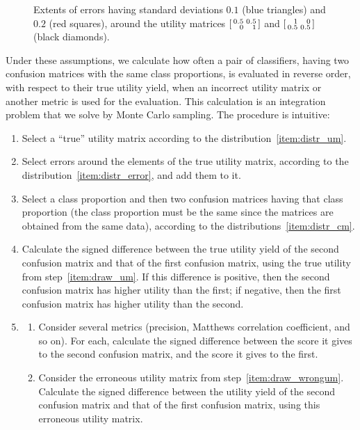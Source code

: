 \documentclass[\ifafour a4paper,12pt,\else a5paper,10pt,\fi%
onecolumn,oneside,article,%
british%
]{memoir}
\theoremstyle{remark}
\theoremstyle{innote}
\renewcommand*{\|}[1][]{\nonscript\:#1\vert\nonscript\:\mathopen{}}
\newcommand*{\sumatrix}[4]{\begin{bsmallmatrix*}[r]#1&#2\\#3&#4\end{bsmallmatrix*}}
\begin{document}
\begin{figure}[t]
{    \caption{Extents of errors having standard deviations $0.1$ ({\color{mypurpleblue}blue triangles}) and $0.2$ ({\color{myred}red squares}), around the utility matrices $\sumatrix{ 0.5}{0.5}{0}{1 }$ and $\sumatrix{ 1}{0}{0.5}{0.5 }$ (black diamonds).}
    \label{fig:error_distr_um}}
\end{figure}

Under these assumptions, we calculate how often a pair of classifiers, having two confusion matrices with the same class proportions, is evaluated in reverse order, with respect to their true utility yield, when an incorrect utility matrix or another metric is used for the evaluation. This calculation is an integration problem that we solve by Monte Carlo sampling. The procedure is intuitive:
\begin{enumerate}[label=\arabic*.,ref=\arabic*]
\item\label{item:draw_um} Select a \enquote{true} utility matrix according to the distribution~\ref{item:distr_um}.
\item\label{item:draw_wrongum} Select errors around the elements of the true utility matrix, according to the distribution~\ref{item:distr_error}, and add them to it.
\item\label{item:draw_cm} Select a class proportion and then two confusion matrices having that class proportion (the class proportion must be the same since the matrices are obtained from the same data), according to the distributions~\ref{item:distr_cm}.
\item\label{item:diff_true} Calculate the signed difference between the true utility yield of the second confusion matrix and that of the first confusion matrix, using the true utility from step~\ref{item:draw_um}. If this difference is positive, then the second confusion matrix has higher utility than the first; if negative, then the first confusion matrix has higher utility than the second.
\item\label{item:diff_other}
    \begin{enumerate}[label=\alph*.]
\item Consider several metrics (precision, Matthews correlation coefficient, and so on). For each, calculate the signed difference between the score it gives to the second confusion matrix, and the score it gives to the first.
\item Consider the erroneous utility matrix from step~\ref{item:draw_wrongum}. Calculate the signed difference between the utility yield of the second confusion matrix and that of the first confusion matrix, using this erroneous utility matrix.

\end{enumerate}
\end{enumerate}
\end{document}
